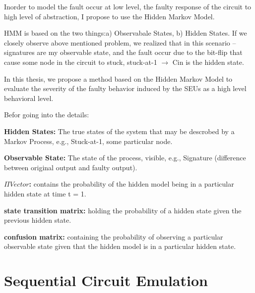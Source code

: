 Inorder to model the fault occur at low level, the faulty response of the circuit to high level of abstraction, I propose to use the Hidden Markov Model.


HMM is based on  the two things:a) Observabale States, b) Hidden States. If we closely observe above mentioned problem, we realized that in this scenario --  signatures are my observable state, and the fault occur due to the bit-flip that cause some node in the circuit to stuck, stuck-at-1 $\rightarrow$ Cin is the hidden state.

In this thesis, we propose a method based on the Hidden Markov Model to evaluate the severity of the faulty behavior induced by the SEUs as a high level behavioral level. 


Befor going into the details:

\textbf{Hidden States:} The true states of the system that may be descrobed by a Markov Process, e.g., Stuck-at-1, some particular node.

\textbf{Observable State:} The state of the process, visible, e.g., Signature (difference between original output and faulty output).

\textbf{$\Pi Vector$:} contains the probability of the hidden model being in a particular hidden state at time t = 1.

\textbf{state transition matrix:}  holding the probability of a hidden state given the previous hidden state.

\textbf{confusion matrix:} containing the probability of observing a particular observable state given that the hidden model is in a particular hidden state. 


\section{Sequential Circuit Emulation}



